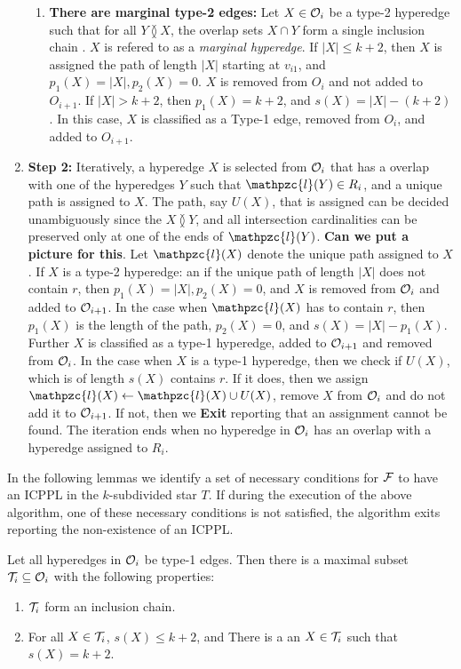 \documentclass[11pt,letter]{../lib/llncs}
\def\cF{{\cal F}}
\def\cO{{\cal O}}
\def\cT{{\cal T}}
\def\cl{\mathpzc{l}}
\def\overlap{\between}
\begin{document}
\begin{enumerate}
\begin{enumerate}
\item {\bf There are marginal type-2 edges:}
Let $X \in \cO_i$ be a type-2 hyperedge such that for all $Y
  \overlap X$, the overlap sets $X \cap Y$ form a single inclusion
  chain \cite{kklv10}. $X$ is refered to as a {\em marginal hyperedge}.  If $|X| \leq k+2$, then $X$ is assigned
the path of length $|X|$ starting at $v_{i1}$, and $p_1(X) = |X|, p_2(X)=0$. $X$ is removed from $O_i$ and not added to $O_{i+1}$.  If $|X| > k+2$, then $p_1(X)=k+2$, and $s(X) = |X| - (k+2)$.   In this case, $X$ is classified as a Type-1 edge, removed from $O_i$, and added to $O_{i+1}$.   
\end{enumerate}
\item {\bf Step 2:} 
Iteratively, a hyperedge $X$ is selected from $\cO_i$ that has a overlap with one of the hyperedges $Y$ such that $\cl(Y) \in R_i$, and a unique path is assigned to $X$.   The path, say $U(X)$, that is assigned can be decided unambiguously since the $X \overlap Y$, and all intersection cardinalities can be preserved only at one of the ends of $\cl(Y)$.  {\bf Can we put a picture for this}.  Let $\cl(X)$ denote the unique path assigned to $X$.  If $X$ is a type-2 hyperedge: an if the unique path of length $|X|$ does not contain $r$, then $p_1(X) = |X|, p_2(X)=0$, and $X$ is
removed from $\cO_i$ and added to $\cO_{i+1}$.  In the case when $\cl(X)$ has to contain $r$, then $p_1(X)$ is the length of the path, $p_2(X)=0$, and $s(X) = |X|-p_1(X)$. Further $X$ is 
classified as a type-1 hyperedge, added to $\cO_{i+1}$ and removed from $\cO_i$.   In the case when $X$ is a type-1 hyperedge, then we check if $U(X)$, which is of length $s(X)$ contains $r$. If it does, then we assign $\cl(X) \leftarrow \cl(X) \cup U(X)$, remove $X$ from $\cO_i$ and do not add it  to $\cO_{i+1}$.  If not, then we {\bf Exit} reporting that an assignment cannot be found.  The iteration ends when no hyperedge in $\cO_i$  has an overlap with a hyperedge assigned to $R_i$.
\end{enumerate}
In the following lemmas we identify a set of necessary conditions for $\cF$ to have an 
ICPPL in the $k$-subdivided star $T$.  If during the execution of the above algorithm, one
of these necessary conditions is not satisfied, the algorithm exits reporting the non-existence of an ICPPL.
\begin{lemma}
Let all hyperedges in $\cO_i$ be type-1 edges.  Then there is a maximal subset $\cT_i \subseteq \cO_i$ with the following properties:
\begin{enumerate}
\item $\cT_i$ form an inclusion chain.
\item For all $X \in \cT_i$, $s(X) \leq k+2$, and There is a an $X \in \cT_i$ such that $s(X)=k+2$.  
\end{enumerate}
\end{lemma}
\end{document}

